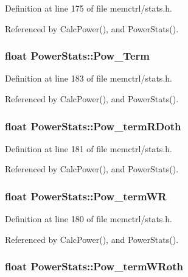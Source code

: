 Definition at line 175 of file memctrl/stats.h.

Referenced by CalcPower(), and PowerStats().
\subsubsection[{Pow\_\-Term}]{\setlength{\rightskip}{0pt plus 5cm}float {\bf PowerStats::Pow\_\-Term}}\label{classPowerStats_b5f2bc484efc2f51efa60805f3c246d9}




Definition at line 183 of file memctrl/stats.h.

Referenced by CalcPower(), and PowerStats().
\subsubsection[{Pow\_\-termRDoth}]{\setlength{\rightskip}{0pt plus 5cm}float {\bf PowerStats::Pow\_\-termRDoth}}\label{classPowerStats_92cdfd1b5df32fbb7ef2d88f12b9efda}




Definition at line 181 of file memctrl/stats.h.

Referenced by CalcPower(), and PowerStats().
\subsubsection[{Pow\_\-termWR}]{\setlength{\rightskip}{0pt plus 5cm}float {\bf PowerStats::Pow\_\-termWR}}\label{classPowerStats_4567f1aea7c8678f792406f3598f63ac}




Definition at line 180 of file memctrl/stats.h.

Referenced by CalcPower(), and PowerStats().
\subsubsection[{Pow\_\-termWRoth}]{\setlength{\rightskip}{0pt plus 5cm}float {\bf PowerStats::Pow\_\-termWRoth}}\label{classPowerStats_4345b4fde92d296ecfc476883b6ce874}




